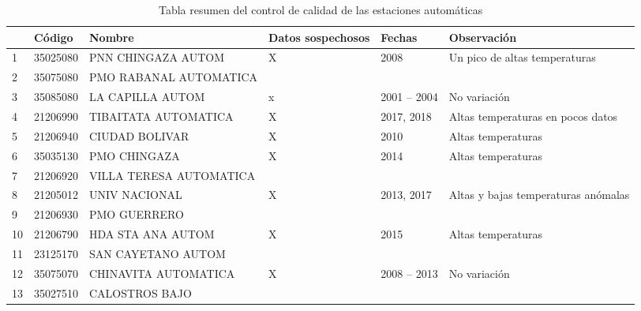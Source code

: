 \begin{table}[H]

\caption{Tabla resumen del control de calidad de las estaciones automáticas}
\label{tab:res_tab_autom}
\begin{tabular}{lllp{2cm}lp{3cm}}
   & Código   & Nombre                  & Datos sospechosos & Fechas      & Observación                                 \\ \hline
1  & 35025080 & PNN CHINGAZA AUTOM      & X                 & 2008        & Un pico de altas temperaturas               \\ \hline
2  & 35075080 & PMO RABANAL AUTOMATICA  &                   &             &                                             \\ \hline
3  & 35085080 & LA CAPILLA AUTOM        & x                 & 2001 – 2004 & No variación                                \\ \hline
4  & 21206990 & TIBAITATA AUTOMATICA    & X                 & 2017, 2018  & Altas temperaturas en pocos datos           \\ \hline
5  & 21206940 & CIUDAD BOLIVAR          & X                 & 2010        & Altas temperaturas                          \\ \hline
6  & 35035130 & PMO CHINGAZA            & X                 & 2014        & Altas temperaturas                          \\ \hline
7  & 21206920 & VILLA TERESA AUTOMATICA &                   &             &                                             \\ \hline
8  & 21205012 & UNIV NACIONAL           & X                 & 2013, 2017  & Altas y bajas temperaturas anómalas         \\ \hline
9  & 21206930 & PMO GUERRERO            &                   &             &                                             \\ \hline
10 & 21206790 & HDA STA ANA AUTOM       & X                 & 2015        & Altas temperaturas                          \\ \hline
11 & 23125170 & SAN CAYETANO AUTOM      &                   &             &                                             \\ \hline
12 & 35075070 & CHINAVITA AUTOMATICA    & X                 & 2008 – 2013 & No variación                                \\ \hline
13 & 35027510 & CALOSTROS BAJO          &                   &             &                                             \\ \hline

\end{tabular}
\end{table}
